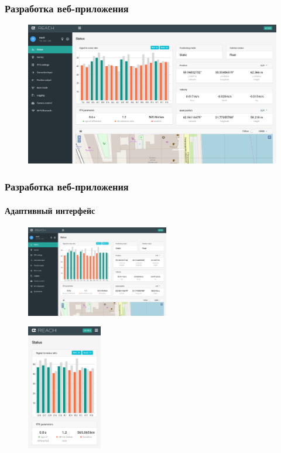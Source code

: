 \documentclass[xetex,t]{beamer}
\begin{document}
%
%
\begin{frame}
  \frametitle{Разработка веб-приложения}
  \vskip -0.5cm
  \begin{figure}[h]
    \centering
    \includegraphics[width=.95\textwidth]{../img/reachview/home}
  \end{figure}
\end{frame}


%
%
\begin{frame}
  \frametitle{Разработка веб-приложения}
  \framesubtitle{Адаптивный интерфейс}
  
  \begin{minipage}{\textwidth}
    \centering
    \begin{minipage}[c]{.5\textwidth}
      \centering
      \begin{figure}[c]
        \centering
        \includegraphics[height=4cm]{../img/reachview/homepage_responsive-lg}
      \end{figure}
    \end{minipage}
    \hspace{2em}
    \begin{minipage}[c]{.3\textwidth}
      \centering
      \begin{figure}[c]
        \centering
        \includegraphics[height=5.5cm]{../img/reachview/homepage_responsive-xs}
      \end{figure}
    \end{minipage}
  \end{minipage}
\end{frame}
\end{document}
